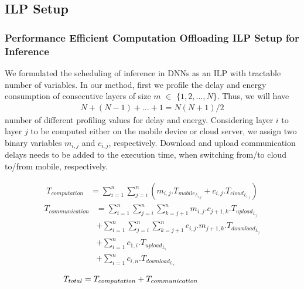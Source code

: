 
\subsection{ILP Setup}

\subsubsection{Performance Efficient Computation Offloading ILP Setup for Inference}

We formulated the scheduling of inference in DNNs as an ILP with tractable number of variables. In our method, first we profile the delay and energy consumption of consecutive layers of size $m$ $\in$ $\{1, 2,\dots, N\}$. Thus, we will have
  \begin{equation}
      \begin{split}
N + (N-1) + ... + 1 = N(N+1)/2
  \end{split}
\end{equation}
number of different profiling values for delay and energy.
Considering layer $i$ to layer $j$ to be computed either on the mobile device or cloud server, we assign two binary variables $m_{i,j}$ and $c_{i,j}$, respectively. Download and upload communication delays needs to be added to the execution time, when switching from/to cloud to/from mobile, respectively.

\begin{equation}
      \begin{split}
T_{computation} &= \sum_{i=1}^{n}{\sum_{j=i}^{n}{
(m_{i,j}.T_{mobile_{L_{i,j}}} + c_{i,j}.T_{cloud_{L_{i,j}}})
}}
  \end{split}
\end{equation}
  \begin{equation}
      \begin{split}
T_{communication} &= \sum_{i=1}^{n}{\sum_{j=i}^{n}{\sum_{k=j+1}^{n}{m_{i,j}.c_{j+1,k}.T_{upload_{L_j}}}}} \\
& + \sum_{i=1}^{n}{\sum_{j=i}^{n}{\sum_{k=j+1}^{n}{c_{i,j}.m_{j+1,k}.T_{download_{L_j}}}}} \\
& + \sum_{i=1}^{n}{c_{1,i}.T_{upload_{L_i}}} \\
& + \sum_{i=1}^{n}{c_{i,n}.T_{download_{L_n}}}
  \end{split}
  \label{eq: full_pass_comm}
\end{equation}

\begin{equation}
T_{total} = T_{computation} + T_{communication}\thinspace\thinspace\thinspace\thinspace\thinspace\thinspace\thinspace\thinspace\thinspace\thinspace\thinspace\thinspace\thinspace\thinspace\thinspace\thinspace\thinspace\thinspace\thinspace\thinspace\thinspace\thinspace\thinspace\thinspace\thinspace\thinspace\thinspace\thinspace\thinspace\thinspace\thinspace
\end{equation}


